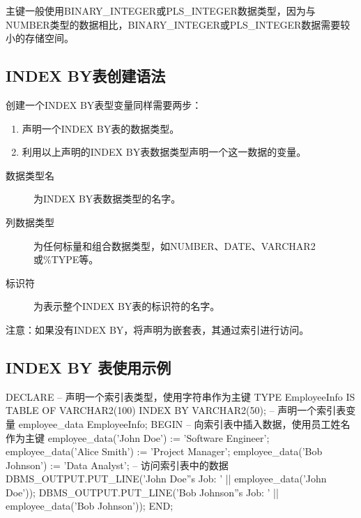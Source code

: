 \documentclass[11pt, a4paper, oneside, UTF8]{ctexbook}
\begin{document}
主键一般使用BINARY\_INTEGER或PLS\_INTEGER数据类型，因为与NUMBER类型的数据相比，BINARY\_INTEGER或PLS\_INTEGER数据需要较小的存储空间。

\subsection{INDEX BY表创建语法}
创建一个INDEX BY表型变量同样需要两步：
\begin{enumerate}
  \item 声明一个INDEX BY表的数据类型。
  \item 利用以上声明的INDEX BY表数据类型声明一个这一数据的变量。
\end{enumerate}


\begin{description}
  \item[数据类型名] 为INDEX BY表数据类型的名字。
  \item[列数据类型] 为任何标量和组合数据类型，如NUMBER、DATE、VARCHAR2或\%TYPE等。
  \item[标识符] 为表示整个INDEX BY表的标识符的名字。
\end{description}

注意：如果没有INDEX BY，将声明为嵌套表，其通过索引进行访问。

\subsection{INDEX BY 表使用示例}
\begin{plsql}[caption=INDEX BY表使用示例1]
DECLARE
  -- 声明一个索引表类型，使用字符串作为主键
  TYPE EmployeeInfo IS TABLE OF VARCHAR2(100) INDEX BY VARCHAR2(50);
  -- 声明一个索引表变量
  employee_data EmployeeInfo;
BEGIN
  -- 向索引表中插入数据，使用员工姓名作为主键
  employee_data('John Doe') := 'Software Engineer';
  employee_data('Alice Smith') := 'Project Manager';
  employee_data('Bob Johnson') := 'Data Analyst';
  -- 访问索引表中的数据
  DBMS_OUTPUT.PUT_LINE('John Doe''s Job: ' || employee_data('John Doe'));
  DBMS_OUTPUT.PUT_LINE('Bob Johnson''s Job: ' || employee_data('Bob Johnson'));
END;
\end{plsql}
\end{document}
